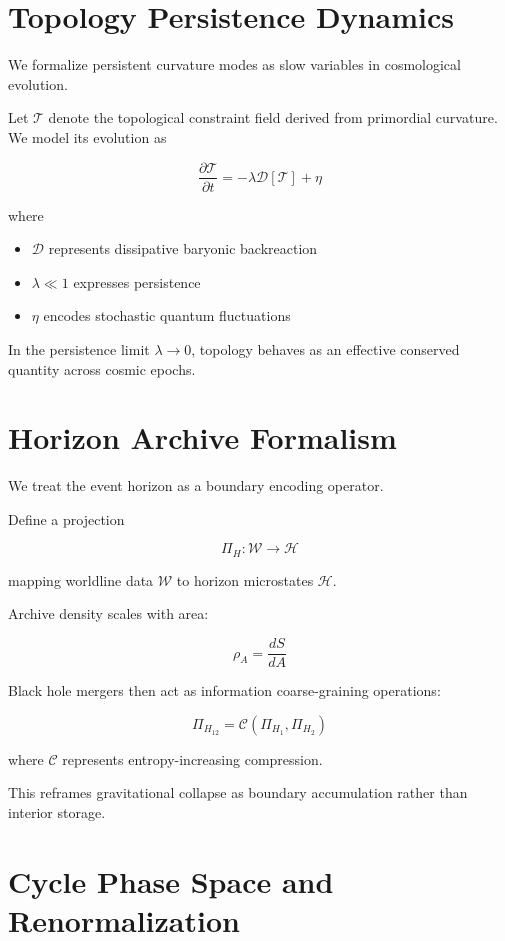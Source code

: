 \documentclass[12pt]{article}
\begin{document}
\section{Topology Persistence Dynamics}

We formalize persistent curvature modes as slow variables in cosmological evolution.

Let $\mathcal{T}$ denote the topological constraint field derived from primordial curvature.
We model its evolution as

\[
\frac{\partial \mathcal{T}}{\partial t}
=
-\lambda \mathcal{D}[\mathcal{T}] + \eta
\]

where

\begin{itemize}
\item $\mathcal{D}$ represents dissipative baryonic backreaction
\item $\lambda \ll 1$ expresses persistence
\item $\eta$ encodes stochastic quantum fluctuations
\end{itemize}

In the persistence limit $\lambda \to 0$, topology behaves as an effective conserved quantity across cosmic epochs.

\section{Horizon Archive Formalism}

We treat the event horizon as a boundary encoding operator.

Define a projection

\[
\Pi_H : \mathcal{W} \rightarrow \mathcal{H}
\]

mapping worldline data $\mathcal{W}$ to horizon microstates $\mathcal{H}$.

Archive density scales with area:

\[
\rho_A = \frac{dS}{dA}
\]

Black hole mergers then act as information coarse-graining operations:

\[
\Pi_{H_{12}} = \mathcal{C}(\Pi_{H_1}, \Pi_{H_2})
\]

where $\mathcal{C}$ represents entropy-increasing compression.

This reframes gravitational collapse as boundary accumulation rather than interior storage.

\section{Cycle Phase Space and Renormalization}
\end{document}
